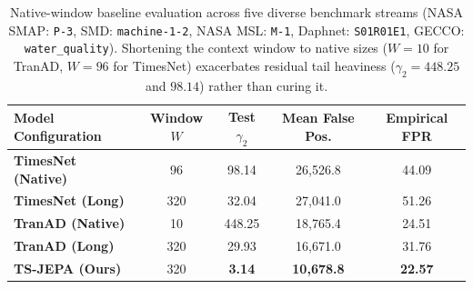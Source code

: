 \begin{table}[t]
\centering
\small
\caption{Native-window baseline evaluation across five diverse benchmark streams (NASA SMAP: \texttt{P-3}, SMD: \texttt{machine-1-2}, NASA MSL: \texttt{M-1}, Daphnet: \texttt{S01R01E1}, GECCO: \texttt{water\_quality}). Shortening the context window to native sizes ($W=10$ for TranAD, $W=96$ for TimesNet) exacerbates residual tail heaviness ($\gamma_2 = 448.25$ and $98.14$) rather than curing it.}
\label{tab:native_window_baselines}
\scriptsize
\setlength{\tabcolsep}{2.5pt}
\begin{tabular}{@{}lcccc@{}}
\toprule
\textbf{Model Configuration} & \textbf{Window $W$} & \textbf{Test $\gamma_2$} & \textbf{Mean False Pos.} & \textbf{Empirical FPR} \\
\midrule
\textbf{TimesNet (Native)} & 96  & 98.14  & 26,526.8 & 44.09 \\
\textbf{TimesNet (Long)}   & 320 & 32.04  & 27,041.0 & 51.26 \\
\midrule
\textbf{TranAD (Native)}   & 10  & 448.25 & 18,765.4 & 24.51 \\
\textbf{TranAD (Long)}     & 320 & 29.93  & 16,671.0 & 31.76 \\
\midrule
\textbf{TS-JEPA (Ours)}    & 320 & \textbf{3.14} & \textbf{10,678.8} & \textbf{22.57} \\
\bottomrule
\end{tabular}
\end{table}

